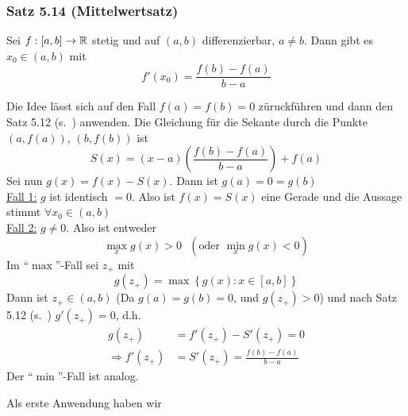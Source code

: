 \subsubsection*{Satz 5.14 (Mittelwertsatz)}\label{satz5.14}
Sei $f:\lbrack a,b\rbrack\to\mathbb{R}$ stetig und auf $\left( a,b\right)$ differenzierbar, $a\not=b$. Dann gibt es $x_0\in\left( a,b\right)$ mit \[f'\left( {{x_0}} \right) = \frac{{f\left( b \right) - f\left( a \right)}}{{b - a}}\]
\begin{center}
\end{center}

\begin{beweis}{}
Die Idee lässt sich auf den Fall $f(a)=f(b)=0$ züruckführen und dann den Satz 5.12 (s.~\pageref{satz5.12}) anwenden. Die Gleichung für die Sekante durch die Punkte $\left( a,f(a)\right)$, $\left( b,f\left( b\right)\right)$ ist
\[S\left( x \right) = \left( {x - a} \right)\left( {\frac{{f\left( b \right) - f(a)}}{{b - a}}} \right) + f\left( a \right)\]
Sei nun $g(x)=f(x)-S(x)$. Dann ist $g(a)=0=g(b)$\\

\noindent\underline{Fall 1:} $g$ ist identisch $=0$. Also ist $f(x)=S(x)$ eine Gerade und die Aussage stimmt $\forall x_0\in\left( a,b\right)$ \\

\noindent\underline{Fall 2:} $g\not=0$. Also ist entweder
\[\mathop {\max }\limits_x g(x) > 0\text{ }\left(\text{oder }\mathop {\min }\limits_x g(x) < 0\right)\]
Im ``$\max$''-Fall sei $z_+$ mit
\[g\left( {{z_ + }} \right) = \max \left\{ {g(x):x \in \left[ {a,b} \right]} \right\}\]
Dann ist $ {{z_ + }} \in\left( a,b\right)$ (Da $g(a)=g(b)=0$, und $g\left( {{z_ + }} \right) >0$) und nach Satz 5.12 (s.~\pageref{satz5.12}) $g'\left( z_+\right)=0$, d.h.
\begin{align*}
g\left( {{z_ + }} \right) &= f'\left( {{z_ + }} \right) - S'\left( {{z_ + }} \right) = 0\\
 \Rightarrow f'\left( {{z_ + }} \right) &= S'\left( {{z_ + }} \right) = \frac{{f\left( b \right) - f\left( a \right)}}{{b - a}}
\end{align*}
Der ``$\min$''-Fall ist analog.
\end{beweis}
Als erste Anwendung haben wir
